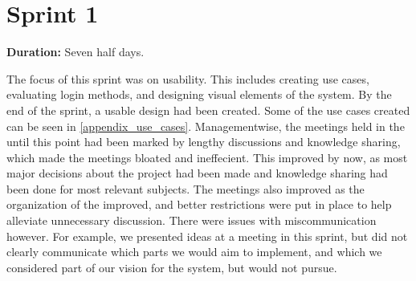 \section{Sprint 1}%

\textbf{Duration:} Seven half days. \newline

The focus of this sprint was on usability. 
This includes creating use cases, evaluating login methods, and designing visual elements of the system. 
By the end of the sprint, a usable design had been created. 
Some of the use cases created can be seen in \autoref{appendix_use_cases}. \newline
Managementwise, the meetings held in the \globalgroup{} until this point had been marked by lengthy discussions and knowledge sharing, which made the meetings bloated and ineffecient. 
This improved by now, as most major decisions about the project had been made and knowledge sharing had been done for most relevant subjects. 
The meetings also improved as the organization of the \globalgroup{} improved, and better restrictions were put in place to help alleviate unnecessary discussion. \newline
There were issues with miscommunication however. 
For example, we presented ideas at a meeting in this sprint, but did not clearly communicate which parts we would aim to implement, and which we considered part of our vision for the system, but would not pursue. 